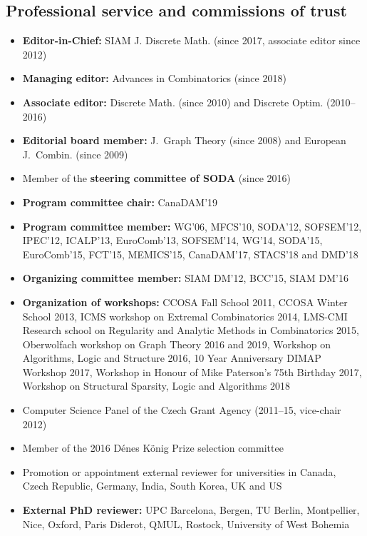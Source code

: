\documentclass[11pt]{article}
\begin{document}
\subsection*{Professional service and commissions of trust}
\begin{itemize}
\setlength\itemsep{-1mm}
\item {\bf Editor-in-Chief:} SIAM J. Discrete Math. (since 2017, associate editor since 2012)
\item {\bf Managing editor:} Advances in Combinatorics (since 2018)
\item {\bf Associate editor:} Discrete Math. (since 2010) and Discrete Optim. (2010--2016)
\item {\bf Editorial board member:} J.~Graph Theory (since 2008) and European J.~Combin. (since 2009)
\item Member of the {\bf steering committee of SODA} (since 2016)
\item {\bf Program committee chair:} CanaDAM'19
\item {\bf Program committee member:} WG'06, MFCS'10, SODA'12, SOFSEM'12, IPEC'12, ICALP'13, EuroComb'13, SOFSEM'14, WG'14, SODA'15, EuroComb'15, FCT'15, MEMICS'15, CanaDAM'17, STACS'18 and DMD'18
\item {\bf Organizing committee member:} SIAM DM'12, BCC'15, SIAM DM'16
\item {\bf Organization of workshops:} CCOSA Fall School 2011, CCOSA Winter School 2013, ICMS workshop on Extremal Combinatorics 2014, LMS-CMI Research school on Regularity and Analytic Methods in Combinatorics 2015, Oberwolfach workshop on Graph Theory 2016 and 2019, Workshop on Algorithms, Logic and Structure 2016, 10 Year Anniversary DIMAP Workshop 2017, Workshop in Honour of Mike Paterson's 75th Birthday 2017, Workshop on Structural Sparsity, Logic and Algorithms 2018 
\item Computer Science Panel of the Czech Grant Agency (2011--15, vice-chair 2012)
\item Member of the 2016 D\'enes K\"onig Prize selection committee
\item Promotion or appointment external reviewer for universities in Canada, Czech Republic, Germany, India, South Korea, UK and US 
\item {\bf External PhD reviewer:}  UPC Barcelona, Bergen, TU Berlin, Montpellier, Nice, Oxford, Paris Diderot, QMUL, Rostock, University of West Bohemia 
\end{itemize}
\end{document}
